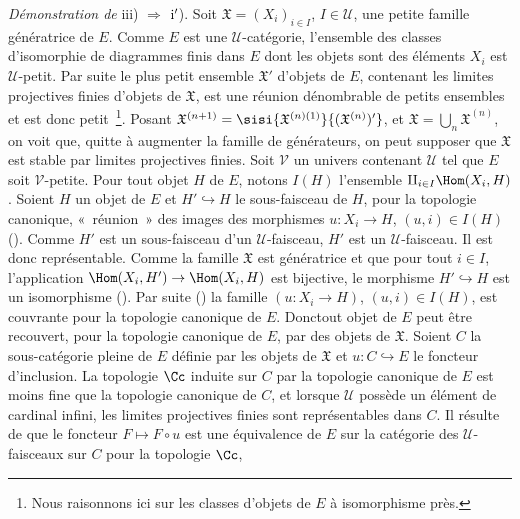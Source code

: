\documentclass[10pt]{../fichiers-configuration-latex/smfart}
\begin{document}
\subsubsection{}
\emph{Démonstration de} iii) $\Rightarrow$ ${\rm i'}$). Soit
$\mathfrak{X}=(X_i)_{i\in I}$, $I\in 𝒰$, une petite famille
génératrice de $E$. Comme $E$ est une $𝒰$-catégorie,
l'ensemble des classes d'isomorphie de diagrammes finis dans $E$
dont les objets sont des éléments $X_i$ est $𝒰$-petit. Par
suite le plus petit ensemble $\mathfrak{X}'$ d'objets de $E$,
contenant les limites projectives finies d'objets de $\mathfrak{X}$,
est une réunion dénombrable de petits ensembles et est donc
petit~\footnote[1]{Nous raisonnons ici sur les classes d'objets de
$E$ à isomorphisme près.}. Posant
$\mathfrak{X}^{(n+1)}=\sisi{\mathfrak{X}^{(n)(1)}}{(\mathfrak{X}^{(n)})'}$, et
$\mathfrak{X}=\bigcup_n \mathfrak{X}^{(n)}$, on voit que, quitte à
augmenter la famille de générateurs, on peut supposer que
$\mathfrak{X}$ est stable par limites projectives finies. Soit
$𝒱$ un univers contenant $𝒰$ tel que $E$ soit
$𝒱$-petite. Pour tout objet $H$ de $E$, notons $I(H)$
l'ensemble $\amalg_{i\in I}\Hom(X_i, H)$. Soient $H$ un objet de $E$
et $H'\hookrightarrow H$ le sous-faisceau de $H$, pour la topologie
canonique, « réunion »  des images des morphismes
$u:X_i\rightarrow H$, $(u,i)\in I(H)$ (). Comme $H'$
est un sous-faisceau d'un $𝒰$-faisceau, $H'$ est un
$𝒰$-faisceau. Il est donc représentable. Comme la famille
$\mathfrak{X}$ est génératrice et que pour tout $i\in I$,
l'application $\Hom(X_i, H')\rightarrow \Hom(X_i,H)$ est bijective,
le morphisme $H'\hookrightarrow H$ est un isomorphisme
(). Par suite () la famille
$(u:X_i\rightarrow H)$, $(u,i)\in I(H)$, est couvrante pour la
topologie canonique de $E$. Donc\pageoriginale tout objet de $E$
peut être recouvert, pour la topologie canonique de $E$, par des
objets de $\mathfrak{X}$. Soient $C$ la sous-catégorie pleine de $E$
définie par les objets de $\mathfrak{X}$ et $u:C\hookrightarrow E$
le foncteur d'inclusion. La topologie $\Cc$ induite sur $C$ par la
topologie canonique de $E$ est moins fine que la topologie canonique
de $C$, et lorsque $𝒰$ possède un élément de cardinal
infini, les limites projectives finies sont représentables dans $C$.
Il résulte de  que le foncteur $F\mapsto F\circ
u$ est une équivalence de $E$ sur la catégorie des
$𝒰$-faisceaux sur $C$ pour la topologie $\Cc$, \cqfd
\end{document}
